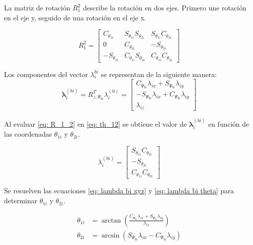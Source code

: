 La matriz de rotación $R_1^2$ describe la rotación en dos ejes.
Primero une rotación en el eje y, seguido de una rotación en el eje x. 

\begin{equation}\label{eq: R_1_2}
R_1^2 = \begin{bmatrix}
C_{\theta_{1i}} & S_{\theta_{1i}} S_{\theta_{2i}} & S_{\theta_{1i}} C_{\theta_{2i}}\\
0 & C_{\theta_{2i}} & -S_{\theta_{2i}}\\
-S_{\theta_{1i}} & C_{\theta_{1i}} S_{\theta_{2i}} & C_{\theta_{1i}} C_{\theta_{2i}}
\end{bmatrix}
\end{equation}

Los componentes del vector $\lambda_i^{bi}$ se representan 
de la siguiente manera:
\begin{equation}\label{eq: lambda bi xyz}
\boldsymbol \lambda_i^{(bi)} = R^T_{z,\Psi_{bi}} \lambda_i^{(0)} = \begin{bmatrix}
C_{\Psi_{bi}} \lambda_{ix} + S_{\Psi_{bi}} \lambda_{iy} \\
-S_{\Psi_{bi}} \lambda_{ix} + C_{\Psi_{bi}} \lambda_{iy} \\
\lambda_{iz}
\end{bmatrix}
\end{equation}

Al evaluar \eqref{eq: R_1_2} en \eqref{eq: th_12} se obtiene el valor
de $\boldsymbol \lambda_i^{(bi)}$ en función de las coordenadas
$\theta_{1i}$ y $\theta_{2i}$.

\begin{equation}\label{eq: lambda bi theta}
\lambda_i^{(bi)} = \begin{bmatrix}
                        S_{\theta_{1i}} C_{\theta_{2i}}\\
                        -S_{\theta_{2i}}\\
                        C_{\theta_{1i}} C_{\theta_{2i}}
                    \end{bmatrix}
\end{equation}

Se resuelven las ecuaciones \eqref{eq: lambda bi xyz} y 
\eqref{eq: lambda bi theta} para determinar $\theta_{1i}$ y $\theta_{2i}$.

\begin{subequations}
 \begin{align}
    \theta_{1i} &= \arctan \left(\frac{C_{\Psi_{bi}} \lambda_{ix} + S_{\Psi_{bi}} \lambda_{iy}}{\lambda_{iz}}\right)\\
    \theta_{2i} &= \arcsin \left(S_{\Psi_{bi}} \lambda_{ix} - C_{\Psi_{bi}} \lambda_{iy}\right)
 \end{align}
\end{subequations}

